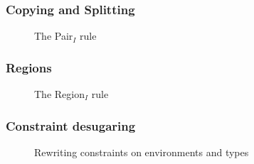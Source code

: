 \subsubsection{Copying and Splitting}
\label{infer:split}

\begin{figure}[!h]
  \centering
  \begin{mathpar}
  \end{mathpar}
  \caption{The {\sc Pair$_I$} rule}
  \label{rule:infer:pair}
\end{figure}

\subsubsection{Regions}
\label{infer:regions}


\begin{figure}[!h]
  \centering
  \begin{mathpar}
  \end{mathpar}
  \caption{The {\sc Region$_I$} rule}
  \label{rule:infer:region}
\end{figure}

\subsubsection{Constraint desugaring}

\begin{figure}[!htb]
  \begin{mathpar}







  \end{mathpar}

  \caption{Rewriting constraints on environments and types}
  \label{rule:typing:desugar}
\end{figure}

